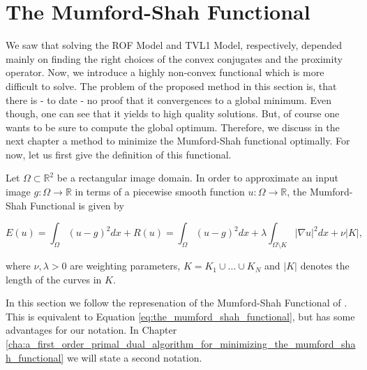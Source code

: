 \section{The Mumford-Shah Functional} %
\label{sec:the_mumford_shah_functional}
    
    We saw that solving the ROF Model and TVL1 Model, respectively, depended mainly on finding the right choices of the convex conjugates and the proximity operator. Now, we introduce a highly non-convex functional which is more difficult to solve. The problem of the proposed method in this section is, that there is - to date - no proof that it convergences to a global minimum. Even though, one can see that it yields to high quality solutions. But, of course one wants to be sure to compute the global optimum. Therefore, we discuss in the next chapter a method to minimize the Mumford-Shah functional optimally. For now, let us first give the definition of this functional.

    \begin{definition} %
    \label{def:the_mumford_shah_functional}

        Let $\Omega \subset \mathbb{R}^{2}$ be a rectangular image domain. In order to approximate an input image $g: \Omega \longrightarrow \mathbb{R}$ in terms of a piecewise smooth function $u: \Omega \longrightarrow \mathbb{R}$, the Mumford-Shah Functional is given by
                
                \begin{equation}
                    E(u) = \int_{\Omega} (u - g)^{2} dx + R(u) = \int_{\Omega} (u - g)^{2} dx + \lambda \int_{\Omega \setminus K} |\nabla u|^{2} dx + \nu |K|,
                \end{equation}
                \label{eq:the_mumford_shah_functional}
            
            where $\nu, \lambda > 0$ are weighting parameters, $K = K_{1} \cup ... \cup K_{N}$ and $|K|$ denotes the length of the curves in $K$.

    \end{definition}

    \begin{remark}
        In this section we follow the represenation of the Mumford-Shah Functional of \cite{Strekalovskiy-Cremers-eccv14}. This is equivalent to Equation \ref{eq:the_mumford_shah_functional}, but has some advantages for our notation. In Chapter \ref{cha:a_first_order_primal_dual_algorithm_for_minimizing_the_mumford_shah_functional} we will state a second notation.
    \end{remark}

